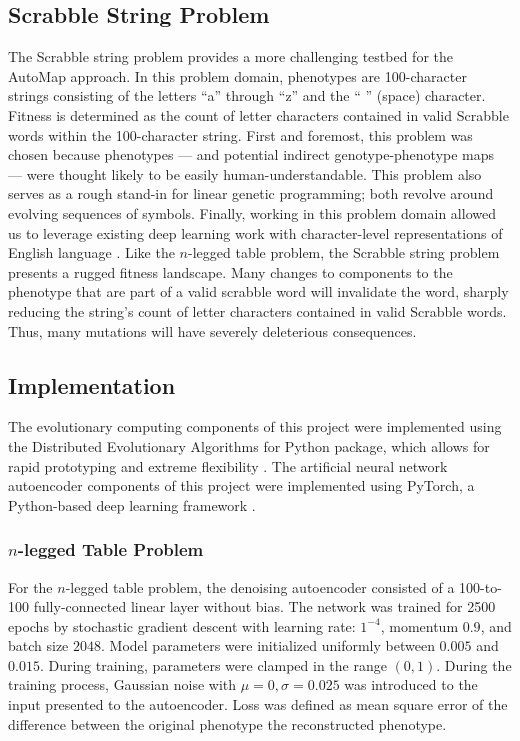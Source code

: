 \subsection{Scrabble String Problem}

The Scrabble string problem provides a more challenging testbed for the AutoMap approach.
In this problem domain, phenotypes are 100-character strings consisting of the letters ``a'' through ``z'' and the `` '' (space) character.
Fitness is determined as the count of letter characters contained in valid Scrabble words within the 100-character string.
First and foremost, this problem was chosen because phenotypes --- and potential indirect genotype-phenotype maps --- were thought likely to be easily human-understandable.
This problem also serves as a rough stand-in for linear genetic programming; both revolve around evolving sequences of symbols.
Finally, working in this problem domain allowed us to leverage existing deep learning work with character-level representations of English language \cite{weiss2016spellling}.
Like the $n$-legged table problem, the Scrabble string problem presents a rugged fitness landscape.
Many changes to components to the phenotype that are part of a valid scrabble word will invalidate the word, sharply reducing the string's count of letter characters contained in valid Scrabble words.
Thus, many mutations will have severely deleterious consequences.

\subsection{Implementation}

The evolutionary computing components of this project were implemented using the Distributed Evolutionary Algorithms for Python package, which allows for rapid prototyping and extreme flexibility \cite{fortin2012deap}.
The artificial neural network autoencoder components of this project were implemented using PyTorch, a Python-based deep learning framework \cite{paszke2017pytorch}.

\subsubsection{$n$-legged Table Problem}

For the $n$-legged table problem, the denoising autoencoder consisted of a 100-to-100 fully-connected linear layer without bias.
The network was trained for 2500 epochs by stochastic gradient descent with learning rate: $1^{-4}$, momentum $0.9$, and batch size $2048$.
Model parameters were initialized uniformly between $0.005$ and $0.015$.
During training, parameters were clamped in the range $(0,1)$.
During the training process, Gaussian noise with $\mu = 0, \sigma = 0.025$ was introduced to the input presented to the autoencoder.
Loss was defined as mean square error of the difference between the original phenotype the reconstructed phenotype.

